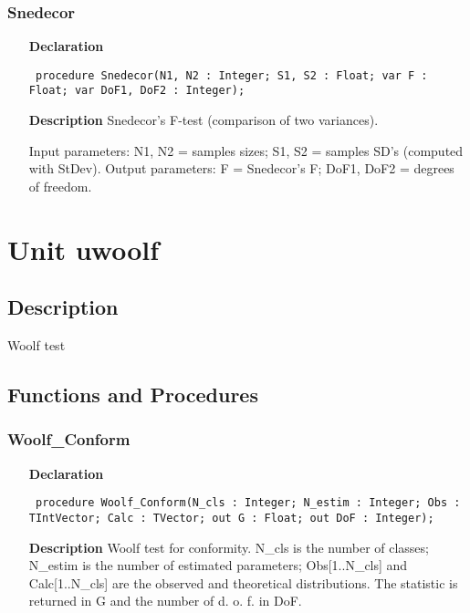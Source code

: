 \documentclass[12pt,a4paper,oneside]{report}
\newcommand{\declarationitem}[1]{\textbf{#1}}
\newcommand{\descriptiontitle}[1]{\textbf{#1}}
\newcommand{\code}[1]{\texttt{#1}}
\begin{document}
\subsubsection{Snedecor}
\label{usnedeco-Snedecor}
\begin{itemize}\item[\declarationitem{Declaration}\hfill]
	\begin{flushleft}
		\code{
			procedure Snedecor(N1, N2 : Integer; S1, S2 : Float; var F : Float; var DoF1, DoF2 : Integer);}
	\end{flushleft}
	\par
	\item[\descriptiontitle{Description}]
	Snedecor's F{-}test (comparison of two variances).
	
	Input parameters: N1, N2 = samples sizes; S1, S2 = samples SD's (computed with StDev). Output parameters: F = Snedecor's F; DoF1, DoF2 = degrees of freedom.
\end{itemize}

\section{Unit uwoolf}
\label{uwoolf}
\subsection{Description}
Woolf test
\subsection{Functions and Procedures}
\subsubsection{Woolf{\_}Conform}
\label{uwoolf-Woolf_Conform}
\begin{itemize}\item[\declarationitem{Declaration}\hfill]
	\begin{flushleft}
		\code{
			procedure Woolf{\_}Conform(N{\_}cls : Integer; N{\_}estim : Integer; Obs : TIntVector; Calc : TVector; out G : Float; out DoF : Integer);}
	\end{flushleft}
	\item[\descriptiontitle{Description}]
	Woolf test for conformity. N{\_}cls is the number of classes; N{\_}estim is the number of estimated parameters; Obs[1..N{\_}cls] and Calc[1..N{\_}cls] are the observed and theoretical distributions. The statistic is returned in G and the number of d. o. f. in DoF.
\end{itemize}
\end{document}
